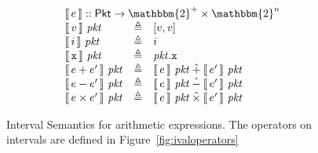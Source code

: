 \begin{figure}
  \[\begin{array}{lcl}
      \multicolumn 3 l {\bracbb{e} :: \Pkt \to \mathbbm{2}^+ \times \mathbbm{2}^n}\\
      \bracbb{v}~\pkt &\triangleq& [v,v] \\
      \bracbb{i}~\pkt &\triangleq& i\\
      \bracbb{\var x}~\pkt & \triangleq & \pkt.\var x \\
      \bracbb{e + e'}~\pkt & \triangleq & \bracbb{e}~\pkt \iplus \bracbb{e'}~\pkt \\
      \bracbb{e - e'}~\pkt & \triangleq & \bracbb{e}~\pkt \iminus \bracbb{e'}~\pkt \\
      \bracbb{e \times e'}~\pkt & \triangleq & \bracbb{e}~\pkt \itimes \bracbb{e'}~\pkt\\      
    \end{array}
    \]
  \caption{Interval Semantics for arithmetic expressions. The operators on intervals are defined in Figure~\ref{fig:ivaloperators}}
  \label{fig:expr-semantics}
\end{figure}

